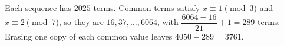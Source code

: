 Each sequence has $2025$ terms. Common terms satisfy $x\equiv1\pmod3$ and $x\equiv2\pmod7$, so they are $16,37,\ldots,6064$, with $\dfrac{6064-16}{21}+1=289$ terms. Erasing one copy of each common value leaves $4050-289=\boxed{3761}$.
